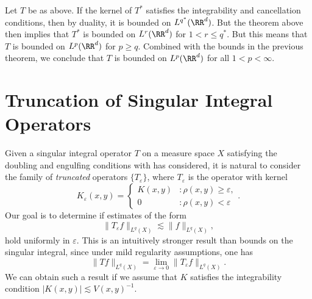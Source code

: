 \begin{remark}
    Let $T$ be as above. If the kernel of $T^*$ satisfies the integrability and cancellation conditions, then by duality, it is bounded on $L^{q^*}(\RR^d)$. But the theorem above then implies that $T^*$ is bounded on $L^r(\RR^d)$ for $1 < r \leq q^*$. But this means that $T$ is bounded on $L^p(\RR^d)$ for $p \geq q$. Combined with the bounds in the previous theorem, we conclude that $T$ is bounded on $L^p(\RR^d)$ for all $1 < p < \infty$.
\end{remark}





\section{Truncation of Singular Integral Operators}

Given a singular integral operator $T$ on a measure space $X$ satisfying the doubling and engulfing conditions with has considered, it is natural to consider the family of \emph{truncated} operators $\{ T_\varepsilon \}$, where $T_\varepsilon$ is the operator with kernel
%
\[ K_\varepsilon(x,y) = \begin{cases} K(x,y) &: \rho(x,y) \geq \varepsilon, \\ 0 &: \rho(x,y) < \varepsilon \end{cases}. \]
%
Our goal is to determine if estimates of the form
%
\[ \| T_\varepsilon f \|_{L^q(X)} \lesssim \| f \|_{L^q(X)}, \]
%
hold uniformly in $\varepsilon$. This is an intuitively stronger result than bounds on the singular integral, since under mild regularity assumptions, one has
%
\[ \| T f \|_{L^q(X)} = \lim_{\varepsilon \to 0} \| T_\varepsilon f \|_{L^q(X)}. \]
%
We can obtain such a result if we assume that $K$ satisfies the integrability condition $|K(x,y)| \lesssim V(x,y)^{-1}$.

